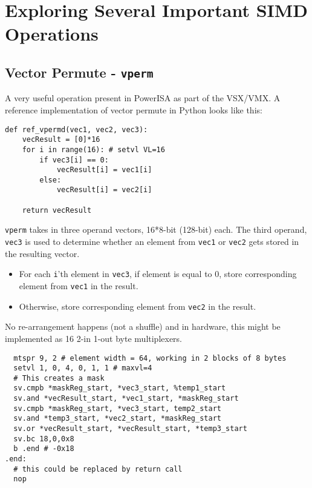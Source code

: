%
\section{Exploring Several Important SIMD Operations}
\subsection{Vector Permute - \texttt{vperm}}

A very useful operation present in PowerISA as part of the
\acrshort{VSX}/\acrshort{VMX}.
A reference implementation of vector permute in Python looks like this:

\begin{verbatim}
def ref_vpermd(vec1, vec2, vec3):
    vecResult = [0]*16
    for i in range(16): # setvl VL=16
        if vec3[i] == 0:
            vecResult[i] = vec1[i]
        else:
            vecResult[i] = vec2[i]

    return vecResult
\end{verbatim}

\texttt{vperm} takes in three operand vectors, 16*8-bit (128-bit) each.
The third operand, \texttt{vec3} is used to determine whether an element from
\texttt{vec1} or \texttt{vec2} gets stored in the resulting vector.

\begin{itemize}
  \item For each \texttt{i}'th element in \texttt{vec3}, if element is
        equal to 0, store corresponding element from \texttt{vec1} in the result.
  \item Otherwise, store corresponding element from \texttt{vec2} in the result.
\end{itemize}

No re-arrangement happens (not a shuffle) and in hardware, this might be
implemented as 16 2-in 1-out byte multiplexers.

\begin{verbatim}
  mtspr 9, 2 # element width = 64, working in 2 blocks of 8 bytes
  setvl 1, 0, 4, 0, 1, 1 # maxvl=4
  # This creates a mask
  sv.cmpb *maskReg_start, *vec3_start, %temp1_start
  sv.and *vecResult_start, *vec1_start, *maskReg_start
  sv.cmpb *maskReg_start, *vec3_start, temp2_start
  sv.and *temp3_start, *vec2_start, *maskReg_start
  sv.or *vecResult_start, *vecResult_start, *temp3_start
  sv.bc 18,0,0x8
  b .end # -0x18
.end:
  # this could be replaced by return call
  nop
\end{verbatim}


